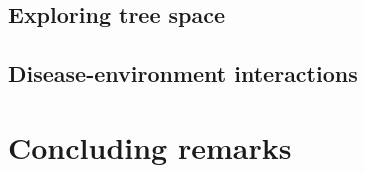 \subsection{Exploring tree space}
\subsection{Disease-environment interactions}

\section{Concluding remarks}

\cleardoublepage

